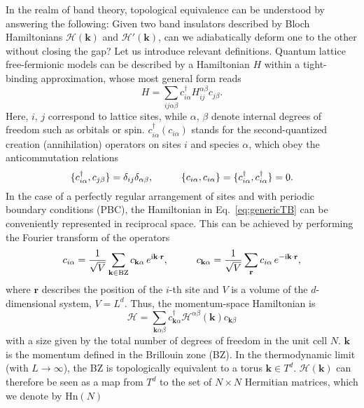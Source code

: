 In the realm of band theory, topological equivalence can be understood by answering the following: Given two band insulators described by Bloch Hamiltonians $\mathcal{H} (\mathbf{k})$ and $\mathcal{H}'(\mathbf{k})$, can we adiabatically deform one to the other without closing the gap? Let us introduce relevant definitions. Quantum lattice free-fermionic models can be described by a Hamiltonian $H$ within a tight-binding approximation, whose most general form reads
\begin{equation}
H = \sum_{ij \alpha \beta} c_{i \alpha}^{\dagger} H_{ij}^{\alpha \beta} c_{j \beta}.
\label{eq:genericTB}
\end{equation}
Here, $i, \, j$ correspond to lattice sites, while $\alpha, \, \beta$ denote internal degrees of freedom such as orbitals or spin. $c_{i \alpha}^{\dagger} ( c_{i \alpha})$ stands for the second-quantized creation (annihilation) operators on sites $i$ and species $\alpha$, which obey the anticommutation relations
\begin{equation}
\lbrace c_{i \alpha}^{\dagger} , c_{j \beta} \rbrace = \delta_{i j}  \delta_{\alpha \beta}, \hspace*{1cm} \lbrace c_{i \alpha}, c_{i \alpha} \rbrace = \lbrace c^{\dagger}_{i \alpha}, c^{\dagger}_{i \alpha} \rbrace  = 0.
\label{eq:commut_rel}
\end{equation}
In the case of a perfectly regular arrangement of sites and with periodic boundary conditions (PBC), the Hamiltonian in Eq.~\eqref{eq:genericTB} can be conveniently represented in reciprocal space. This can be achieved by performing the Fourier transform of the operators
\begin{equation}
 c_{i \alpha} = \frac{1}{\sqrt{V}} \sum_{\mathbf{k} \in \mathrm{BZ}} c_{\mathbf{k} \alpha} \,  e^{\mathrm{i} \mathbf{k} \cdot \mathbf{r}}, \hspace*{1cm} c_{\mathbf{k} \alpha} = \frac{1}{\sqrt{V}} \sum_{\mathbf{r}} c_{i \alpha} \, e^{-\mathrm{i} \mathbf{k} \cdot \mathbf{r}}, 
\label{eq:fourier}
\end{equation}
where $\mathbf{r}$ describes the position of the $i$-th site and $V$ is a volume of the $d$-dimensional system, $V = L^d$. Thus, the momentum-space Hamiltonian is
\begin{equation}
\mathcal{H}= \sum_{\mathbf{k} \alpha \beta} c^{\dagger}_{\mathbf{k} \alpha} \mathcal{H}^{\alpha \beta} (\mathbf{k}) c_{\mathbf{k} \beta}
\label{eq:genericTB_kspace}
\end{equation}
with a size given by the total number of degrees of freedom in the unit cell $N$. $\mathbf{k}$ is the momentum defined in the Brillouin zone (BZ). In the thermodynamic limit (with $L \rightarrow \infty$), the BZ is topologically equivalent to a torus $\mathbf{k} \in T^d$. $\mathcal{H} (\mathbf{k})$ can therefore be seen as a map from $T^d$ to the set of $N \times N$ Hermitian matrices, which we denote by $\mathrm{Hn} (N)$
